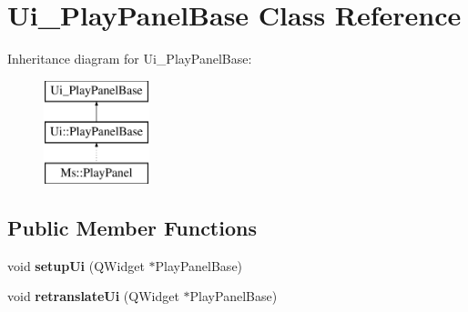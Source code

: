 \hypertarget{class_ui___play_panel_base}{}\section{Ui\+\_\+\+Play\+Panel\+Base Class Reference}
\label{class_ui___play_panel_base}
Inheritance diagram for Ui\+\_\+\+Play\+Panel\+Base\+:\begin{figure}[H]
\begin{center}
\leavevmode
\includegraphics[height=3.000000cm]{class_ui___play_panel_base}
\end{center}
\end{figure}
\subsection*{Public Member Functions}
\begin{DoxyCompactItemize}
\item 
\mbox{\label{class_ui___play_panel_base_a3d5d5a45995d5f8f3e464aa68552b62f}} 
void {\bfseries setup\+Ui} (Q\+Widget $\ast$Play\+Panel\+Base)
\item 
\mbox{\label{class_ui___play_panel_base_a44ee1a72b5c977aeed0dea9362e2da4c}} 
void {\bfseries retranslate\+Ui} (Q\+Widget $\ast$Play\+Panel\+Base)
\end{DoxyCompactItemize}
